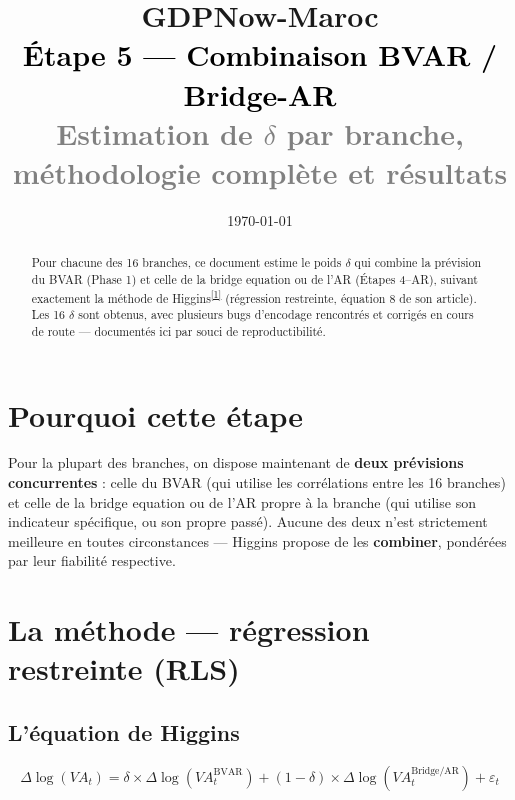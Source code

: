 \documentclass[11pt,a4paper]{article}
\title{\vspace{-1.3cm}\textcolor{bleuprincip}{\Huge\bfseries GDPNow-Maroc}\\[0.3cm]
\textcolor{black}{\Large Étape 5 --- Combinaison BVAR / Bridge-AR}\\[0.15cm]
\textcolor{gray}{\large Estimation de $\delta$ par branche, méthodologie complète et résultats}}
\author{}
\date{\today}
\newcommand{\cit}[1]{\textsuperscript{\hyperlink{ref#1}{[#1]}}}
\begin{document}
\maketitle
\thispagestyle{empty}

\begin{abstract}
\noindent Pour chacune des 16 branches, ce document estime le poids $\delta$ qui combine la prévision du BVAR (Phase 1) et celle de la bridge equation ou de l'AR (Étapes 4--AR), suivant exactement la méthode de Higgins\cit{1} (régression restreinte, équation 8 de son article). Les 16 $\delta$ sont obtenus, avec plusieurs bugs d'encodage rencontrés et corrigés en cours de route --- documentés ici par souci de reproductibilité.
\end{abstract}

\tableofcontents
\vspace{0.5cm}

\section{Pourquoi cette étape}

\begin{intuition}
Pour la plupart des branches, on dispose maintenant de \textbf{deux prévisions concurrentes} : celle du BVAR (qui utilise les corrélations entre les 16 branches) et celle de la bridge equation ou de l'AR propre à la branche (qui utilise son indicateur spécifique, ou son propre passé). Aucune des deux n'est strictement meilleure en toutes circonstances --- Higgins propose de les \textbf{combiner}, pondérées par leur fiabilité respective.
\end{intuition}

\section{La méthode --- régression restreinte (RLS)}

\subsection{L'équation de Higgins}

\begin{equation}
\Delta\log(VA_t) = \delta \times \Delta\log(VA_t^{\text{BVAR}}) + (1-\delta) \times \Delta\log(VA_t^{\text{Bridge/AR}}) + \varepsilon_t
\label{eq:combinaison}
\end{equation}
\end{document}
